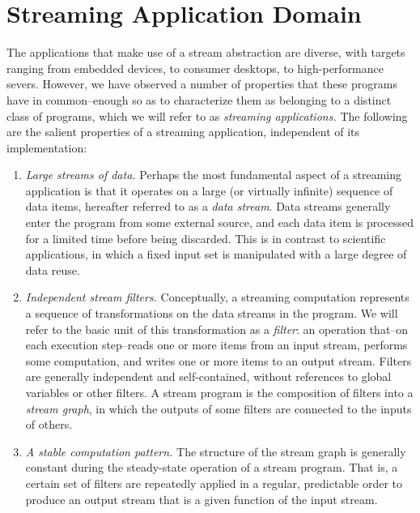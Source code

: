 \section{Streaming Application Domain}
\label{sec:domain}

The applications that make use of a stream abstraction are diverse,
with targets ranging from embedded devices, to consumer desktops, to
high-performance severs.  However, we have observed a number of
properties that these programs have in common--enough so as to
characterize them as belonging to a distinct class of programs, which
we will refer to as {\it streaming applications.}  The following are
the salient properties of a streaming application, independent of its
implementation:
\begin{enumerate}

\item {\it Large streams of data.}  Perhaps the most fundamental
aspect of a streaming application is that it operates on a large (or
virtually infinite) sequence of data items, hereafter referred to as a
{\it data stream}.  Data streams generally enter the program from some
external source, and each data item is processed for a limited time
before being discarded.  This is in contrast to scientific
applications, in which a fixed input set is manipulated with a large
degree of data reuse.

\item {\it Independent stream filters.}  Conceptually, a streaming computation
represents a sequence of transformations on the data streams in the
program.  We will refer to the basic unit of this transformation as a
{\it filter}: an operation that--on each execution step--reads one or
more items from an input stream, performs some computation, and writes
one or more items to an output stream.  Filters are generally
independent and self-contained, without references to global variables
or other filters.  A stream program is the composition of filters into
a {\it stream graph}, in which the outputs of some filters are
connected to the inputs of others.

\item {\it A stable computation pattern.}  The structure of the stream
graph is generally constant during the steady-state operation of a
stream program.  That is, a certain set of filters are repeatedly
applied in a regular, predictable order to produce an output stream
that is a given function of the input stream.


\end{enumerate}

